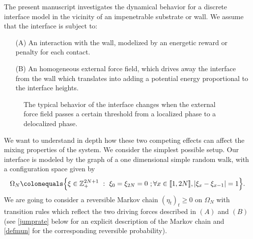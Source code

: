 \documentclass[reqno,11pt]{amsart}
\numberwithin{equation}{section}
\newcommand{\gO}{\Omega}
\newcommand{\lint}{\llbracket}
\newcommand{\rint}{\rrbracket}
\begin{document}
The present manuscript investigates the dynamical behavior for a discrete interface model in the vicinity of an impenetrable substrate or wall. We assume that the interface is subject to:
\begin{itemize}
 \item [(A)] An interaction with the wall, modelized by an energetic reward or penalty for each contact.
 \item [(B)] An homogeneous external force field, which drives away the interface from the wall which translates into adding a potential energy proportional to the interface heights.
\end{itemize}
\begin{figure}[h]
\centering
  \caption{The typical behavior of the interface changes when the external force field passes a certain threshold from a localized phase to a delocalized phase.}
  \label{fig:pinbubble}
\end{figure}
We want to understand in depth how these two competing effects can affect the mixing properties of the system.
We consider the simplest possible setup. Our interface is modeled by the graph of a one dimensional simple random walk, with a configuration space given by
\begin{equation*}
\Omega_N \colonequals \Big\{\xi\in \mathbb{Z}_+^{2N+1} \ : \   \xi_0=\xi_{2N}=0 \ ;  \forall x \in \lint 1, 2N \rint, \vert \xi_{x}-\xi_{x-1}\vert=1 \Big\}.
\end{equation*}
We are going to consider a reversible Markov chain  $(\eta_t)_t\ge 0$ on $\gO_N$ with transition rules which reflect the two driving forces described in $(A)$ and $(B)$
(see \eqref{jumprate} below for an explicit description of the Markov chain and \eqref{defmun} for the corresponding reversible probability).
\end{document}
